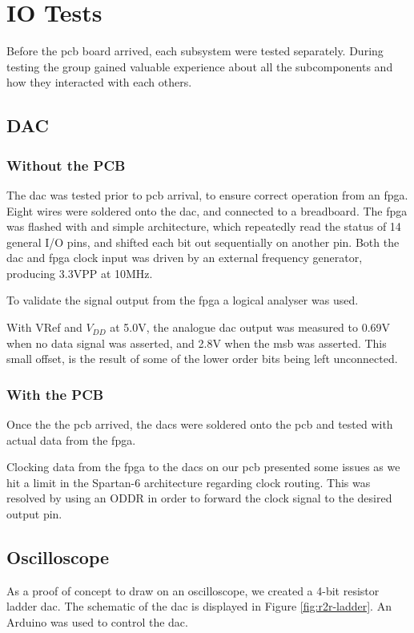 \section{IO Tests}
Before the \gls{pcb} board arrived, each subsystem were tested separately.
During testing the group gained valuable experience about all the subcomponents and how they interacted with each others.

\subsection{DAC}

\subsubsection{Without the PCB}

The \gls{dac} was tested prior to \gls{pcb} arrival, to ensure correct operation from an \gls{fpga}.
Eight wires were soldered onto the \gls{dac}, and connected to a breadboard.
The \gls{fpga} was flashed with and simple architecture, which repeatedly read the status of 14 general I/O pins, and shifted each bit out sequentially on another pin.
Both the \gls{dac} and \gls{fpga} clock input was driven by an external frequency generator, producing 3.3VPP at 10MHz.

To validate the signal output from the \gls{fpga} a logical analyser was used.

With VRef and \(V_{DD}\) at 5.0V, the analogue \gls{dac} output was measured to 0.69V when no data signal was asserted, and 2.8V when the \gls{msb} was asserted. This small offset, is the result of some of the lower order bits being left unconnected.

\subsubsection{With the PCB}

Once the the \gls{pcb} arrived, the \gls{dac}s were soldered onto the \gls{pcb} and tested with actual data from the \gls{fpga}.

Clocking data from the \gls{fpga} to the \gls{dac}s on our \gls{pcb} presented some issues as we hit a limit in the Spartan-6 architecture regarding clock routing. This was resolved by using an ODDR\cite[pp. 61--65]{fpga-io} in order to forward the clock signal to the desired output pin.


\subsection{Oscilloscope}
As a proof of concept to draw on an oscilloscope, we created a 4-bit resistor ladder \gls{dac}. The schematic of the \gls{dac} is displayed in Figure \ref{fig:r2r-ladder}.
An Arduino was used to control the \gls{dac}.

